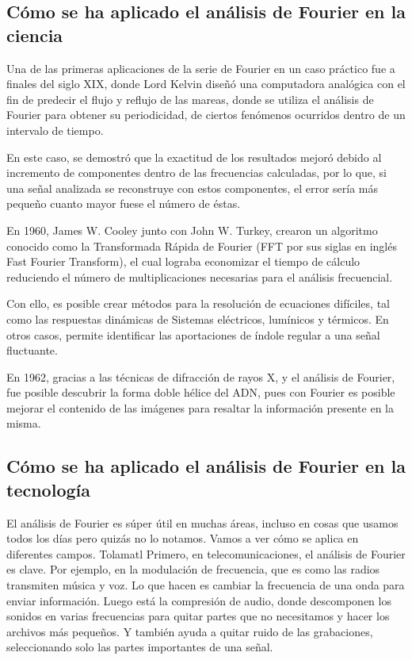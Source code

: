 \subsection{Cómo se ha aplicado el análisis de Fourier en la ciencia}

Una de las primeras aplicaciones de la serie de Fourier en un caso práctico fue a finales del siglo XIX, donde Lord Kelvin diseñó una computadora analógica con el fin de predecir el flujo y reflujo de las mareas, donde se utiliza el análisis de Fourier para obtener su periodicidad, de ciertos fenómenos ocurridos dentro de un intervalo de tiempo.

En este caso, se demostró que la exactitud de los resultados mejoró debido al incremento de componentes dentro de las frecuencias calculadas, por lo que, si una señal analizada se reconstruye con estos componentes, el error sería más pequeño cuanto mayor fuese el número de éstas.

En 1960, James W. Cooley junto con John W. Turkey, crearon un algoritmo conocido como la Transformada Rápida de Fourier (FFT por sus siglas en inglés Fast Fourier Transform), el cual lograba economizar el tiempo de cálculo reduciendo el número de multiplicaciones necesarias para el análisis frecuencial.

Con ello, es posible crear métodos para la resolución de ecuaciones difíciles, tal como las respuestas dinámicas de Sistemas eléctricos, lumínicos y térmicos. En otros casos, permite identificar las aportaciones de índole regular a una señal fluctuante.

En 1962, gracias a las técnicas de difracción de rayos X, y el análisis de Fourier, fue posible descubrir la forma doble hélice del ADN, pues con Fourier es posible mejorar el contenido de las imágenes para resaltar la información presente en la misma.

\subsection{Cómo se ha aplicado el análisis de Fourier en la tecnología}

El análisis de Fourier es súper útil en muchas áreas, incluso en cosas que usamos todos los días pero quizás no lo notamos. Vamos a ver cómo se aplica en diferentes campos.
Tolamatl
Primero, en telecomunicaciones, el análisis de Fourier es clave. Por ejemplo, en la modulación de frecuencia, que es como las radios transmiten música y voz. Lo que hacen es cambiar la frecuencia de una onda para enviar información. Luego está la compresión de audio, donde descomponen los sonidos en varias frecuencias para quitar partes que no necesitamos y hacer los archivos más pequeños. Y también ayuda a quitar ruido de las grabaciones, seleccionando solo las partes importantes de una señal.

